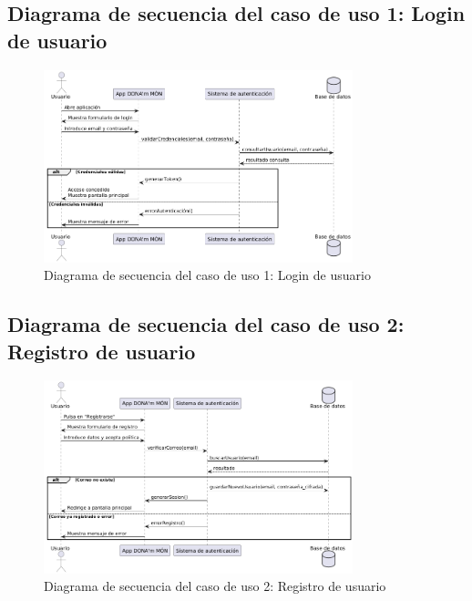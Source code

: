 \subsection{Diagrama de secuencia del caso de uso 1: Login de usuario}
\begin{figure}[H]
    \centering
    \includegraphics[width=0.8\textwidth]{figs/caso1.png}
    \caption{Diagrama de secuencia del caso de uso 1: Login de usuario}
\end{figure}

\subsection{Diagrama de secuencia del caso de uso 2: Registro de usuario}
\begin{figure}[H]
    \centering
    \includegraphics[width=0.8\textwidth]{figs/caso2.png}
    \caption{Diagrama de secuencia del caso de uso 2: Registro de usuario}
\end{figure}

